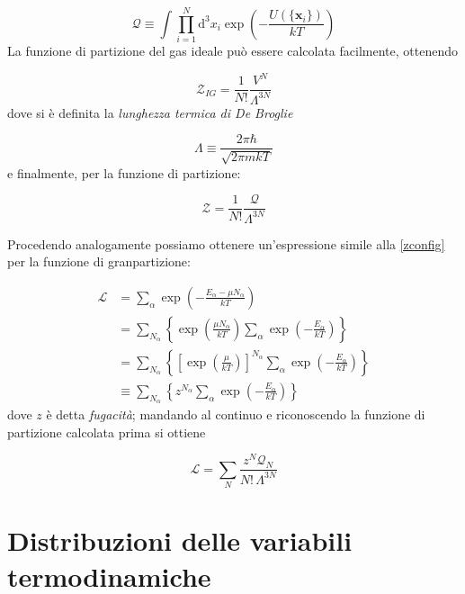 \documentclass[a4paper]{report}
\begin{document}
\begin{equation}
    \mathcal{Q} \equiv \int \prod_{i=1}^{N} \mathrm{d}^3 x_i \exp\left(-\frac{U(\{\mathbf{x}_i\})}{k T}\right)
\end{equation}
La funzione di partizione del gas ideale può essere calcolata facilmente, ottenendo

\begin{equation}
    \mathcal{Z}_{IG} = \frac{1}{N!}\frac{V^N}{\Lambda^{3N}}
\end{equation}
dove si è definita la \textit{lunghezza termica di De Broglie}

\begin{equation}
    \Lambda \equiv \frac{2\pi\hbar}{\sqrt{2\pi m k T}}
    \label{lambdatermica}
\end{equation}
e finalmente, per la funzione di partizione:

\begin{equation}
     \mathcal{Z} = \frac{1}{N!} \frac{\mathcal{Q}}{\Lambda^{3N}}
     \label{zconfig}
\end{equation}


Procedendo analogamente possiamo ottenere un'espressione simile alla \eqref{zconfig} per la funzione di granpartizione:

\begin{equation}
\begin{split}
    \mathcal{L} & = \sum_{\alpha} \exp\left(-\frac{E_\alpha-\mu N_\alpha}{k T}\right) \\
    & = \sum_{N_\alpha} \left\{ \exp\left(\frac{\mu N_\alpha}{k T}\right) \sum_{\alpha} \exp\left(-\frac{E_\alpha}{k T}\right) \right\} \\
    & = \sum_{N_\alpha} \left\{ \left[\exp\left(\frac{\mu}{k T}\right)\right]^{N_\alpha} \sum_{\alpha} \exp\left(-\frac{E_\alpha}{k T}\right) \right\} \\
    & \equiv \sum_{N_\alpha} \left\{ z^{N_\alpha} \sum_{\alpha} \exp\left(-\frac{E_\alpha}{k T}\right) \right\}
\end{split}
\end{equation}
dove $z$ è detta \textit{fugacità}; mandando al continuo e riconoscendo la funzione di partizione calcolata prima si ottiene

\begin{equation}
    \mathcal{L} = \sum_N \frac{z^N \mathcal{Q}_N}{N!\,\Lambda^{3N}}
\end{equation}

\section{Distribuzioni delle variabili termodinamiche}
\end{document}
